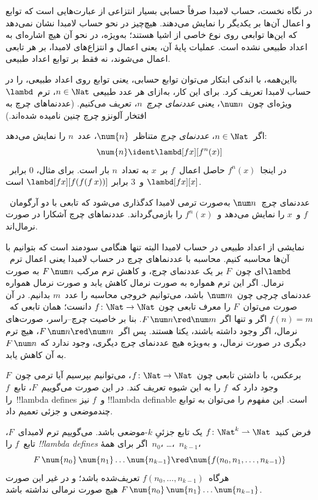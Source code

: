 \documentclass[../../../include/open-logic-section]{subfiles}
\begin{document}

در نگاه نخست، حساب لامبدا صرفاً حسابی بسیار انتزاعی از عبارت‌هایی است
که توابع و اعمال آن‌ها بر یکدیگر را نمایش می‌دهند. هیچ‌چیز در نحو حساب
لامبدا نشان نمی‌دهد که این‌ها توابعی روی نوع خاصی از اشیا هستند؛ به‌ویژه،
در نحو آن هیچ اشاره‌ای به اعداد طبیعی نشده است. عملیات پایهٔ آن، یعنی
اعمال و انتزاع‌های لامبدا، بر هر تابعی اعمال می‌شوند، نه فقط بر توابع
اعداد طبیعی.

بااین‌همه، با اندکی ابتکار می‌توان توابع حسابی، یعنی توابع روی اعداد
طبیعی، را در حساب لامبدا تعریف کرد. برای این کار، به‌ازای هر عدد طبیعی
$n \in \Nat$، ترم~$\lambd$ ویژه‌ای چون~$\num n$، یعنی \emph{عددنمای
چرچ}~$n$، تعریف می‌کنیم. (عددنماهای چرچ به افتخار آلونزو چرچ چنین
نامیده شده‌اند.)

\begin{defn}
  اگر~$n \in \Nat$، \emph{عددنمای چرچ} متناظر~$\num{n}$، عدد~$n$ را
  نمایش می‌دهد:
  \[
    \num{n} \ident \lambd[fx][f^n(x)]
  \]
  در اینجا~$f^n(x)$ حاصل اعمال~$f$ بر~$x$ به تعداد~$n$ بار است. برای
  مثال، $\num{0}$ برابر~$\lambd[fx][x]$ و~$\num{3}$ برابر
  $\lambd[fx][f(f(f\,x))]$ است.
\end{defn}
  
عددنمای چرچ~$\num n$ به‌صورت ترمی لامبدا کدگذاری می‌شود که تابعی با دو
آرگومان~$f$ و~$x$ را نمایش می‌دهد و~$f^n(x)$ را بازمی‌گرداند.
عددنماهای چرچ آشکارا در صورت نرمال‌اند.

نمایشی از اعداد طبیعی در حساب لامبدا البته تنها هنگامی سودمند است که
بتوانیم با آن‌ها محاسبه کنیم. محاسبه با عددنماهای چرچ در حساب لامبدا
یعنی اعمال ترم~$\lambd$ای چون~$F$ بر یک عددنمای چرچ، و کاهش ترم مرکب
$F\, \num n$ به صورت نرمال. اگر این ترم همواره به صورت نرمال کاهش یابد
و صورت نرمال همواره عددنمای چرچی چون~$\num m$ باشد، می‌توانیم خروجی
محاسبه را عدد~$m$ بدانیم. در آن صورت می‌توان~$F$ را معرف تابعی چون
$f\colon \Nat \to \Nat$ دانست؛ همان تابعی که~$f(n) = m$ اگر و تنها اگر
$F\, \num n \red \num m$. بنا بر خاصیت چرچ--راسر، صورت‌های نرمال، اگر
وجود داشته باشند، یکتا هستند. پس اگر~$F\, \num n \red \num m$، هیچ
ترم دیگری در صورت نرمال، و به‌ویژه هیچ عددنمای چرچ دیگری، وجود ندارد که
$F \, \num n$ به آن کاهش یابد.

برعکس، با داشتن تابعی چون~$f\colon \Nat \to \Nat$، می‌توانیم بپرسیم آیا
ترمی چون~$F$ وجود دارد که~$f$ را به این شیوه تعریف کند. در این صورت
می‌گوییم~$F$، تابع~$f$ را~!!{lambda define}s و~$f$ نیز
!!{lambda definable} است. این مفهوم را می‌توان به توابع چندموضعی و جزئی
تعمیم داد.

\begin{defn}
فرض کنید~$f\colon \Nat^k \rightharpoonup \Nat$ یک تابع جزئیِ
$k$-موضعی باشد. می‌گوییم ترم لامبدای~$F$، تابع~$f$ را
\emph{!!{lambda define}s} اگر برای همهٔ~$n_0$، \dots،~$n_{k-1}$،
\[
F \, \num{n_0} \, \num{n_1} \dots \num{n_{k-1}} \red \num{f(n_0, n_1, \dots,
  n_{k-1})}
\]
هرگاه~$f(n_0, \dots, n_{k-1})$ تعریف‌شده باشد؛ و در غیر این صورت
$F \, \num{n_0} \, \num{n_1} \dots \num{n_{k-1}}$ هیچ صورت نرمالی
نداشته باشد.
\end{defn}
\end{document}

